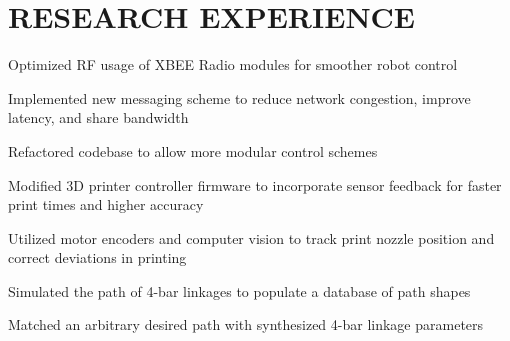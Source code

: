 \documentclass[]{resume}
\begin{document}
\newpage
{}

\begin{minipage}[t]{0.33\textwidth} 
\section{}
\sectionsep
\end{minipage} 
\begin{minipage}[t]{0.66\textwidth} 

\section{RESEARCH EXPERIENCE}

\hfill
\begin{tightemize}
\item Optimized RF usage of XBEE Radio modules for smoother robot control
\item Implemented new messaging scheme to reduce network congestion, improve latency, and share bandwidth
\item Refactored codebase to allow more modular control schemes
\end{tightemize}
\sectionsep

\begin{tightemize}
\item Modified 3D printer controller firmware to incorporate sensor feedback for faster print times and higher accuracy
\item Utilized motor encoders and computer vision to track print nozzle position and correct deviations in printing
\end{tightemize}
\sectionsep

\begin{tightemize}
\item Simulated the path of 4-bar linkages to populate a database of path shapes
\item Matched an arbitrary desired path with synthesized 4-bar linkage parameters
\end{tightemize}
\sectionsep


\end{minipage} 
\end{document}
